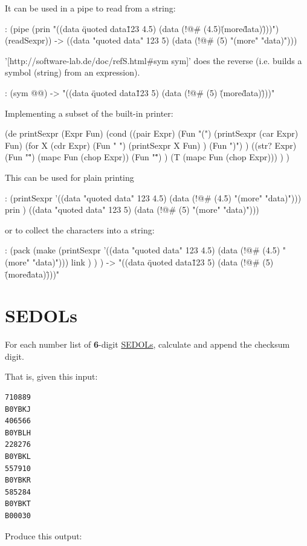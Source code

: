 \begin{wideverbatim}

It can be used in a pipe to read from a string:

: (pipe (prin "((data \"quoted data\" 123 4.5)
                (data (!@# (4.5)\"(more\" \"data)\")))")(readSexpr))
-> ((data "quoted data" 123 5) (data (!@# (5) "(more" "data)")))

'[http://software-lab.de/doc/refS.html#sym sym]' does the reverse (i.e. builds a
symbol (string) from an expression).

: (sym @@)
-> "((data \"quoted data\" 123 5) (data (!@# (5) \"(more\" \"data)\")))"

Implementing a subset of the built-in printer:

(de printSexpr (Expr Fun)
   (cond
      ((pair Expr)
         (Fun "(")
         (printSexpr (car Expr) Fun)
         (for X (cdr Expr)
            (Fun " ")
            (printSexpr X Fun) )
         (Fun ")") )
      ((str? Expr)
         (Fun "\"")
         (mapc Fun (chop Expr))
         (Fun "\"") )
      (T (mapc Fun (chop Expr))) ) )

This can be used for plain printing

: (printSexpr
   '((data "quoted data" 123 4.5) (data (!@# (4.5) "(more" "data)")))
   prin )
((data "quoted data" 123 5) (data (!@# (5) "(more" "data)")))

or to collect the characters into a string:

: (pack
   (make
      (printSexpr
         '((data "quoted data" 123 4.5) (data (!@# (4.5) "(more" "data)")))
         link ) ) )
-> "((data \"quoted data\" 123 5) (data (!@# (5) \"(more\" \"data)\")))"

\end{wideverbatim}

\pagebreak{}
\section*{SEDOLs}

For each number list of \textbf{6}-digit
\href{http://en.wikipedia.org/wiki/SEDOL}{SEDOLs}, calculate and
append the checksum digit.

That is, given this input:

\begin{verbatim}
710889
B0YBKJ
406566
B0YBLH
228276
B0YBKL
557910
B0YBKR
585284
B0YBKT
B00030
\end{verbatim}

Produce this output:

